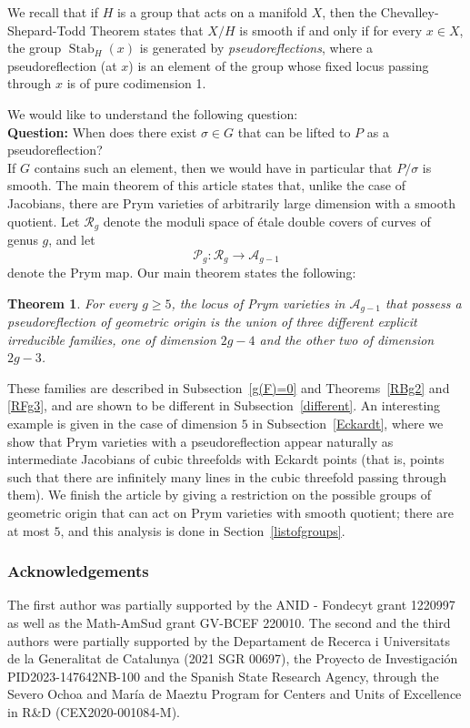 \documentclass[preprint,12pt]{amsart}
\def\cA{\ensuremath{\mathcal{A}}}
\def\cP{\ensuremath{\mathcal{P}}}
\def\cR{\ensuremath{\mathcal{R}}}
\theoremstyle{plain}
\newtheorem{theorem}{Theorem}[section]
\theoremstyle{definition}
\begin{document}
We recall that if $H$ is a group that acts on a manifold $X$, then the Chevalley-Shepard-Todd Theorem states that $X/H$ is smooth if and only if for every $x\in X$, the group $\operatorname{Stab}_H(x)$ is generated by \textit{pseudoreflections}, where a pseudoreflection (at $x$) is an element of the group whose fixed locus passing through $x$ is of pure codimension 1.

We would like to understand the following question:\\

\textbf{Question:} When does there exist $\sigma\in G$ that can be lifted to $P$ as a pseudoreflection?\\

If $G$ contains such an element, then we would have in particular that $P/\sigma$ is smooth.
The main theorem of this article states that, unlike the case of Jacobians, there are Prym varieties of arbitrarily large dimension with a smooth quotient.
Let $\cR_g$ denote the moduli space of \'etale double covers of curves of genus $g$, and let 
\[\cP_g:\cR_g\to \cA_{g-1}\]
denote the Prym map.
Our main theorem states the following:

\begin{theorem}
For every $g\ge5$, the locus of Prym varieties in $\cA_{g-1}$ that possess a pseudoreflection of geometric origin is the union of three different explicit irreducible families, one of dimension $2g-4$ and the other two of dimension $2g-3$.
\end{theorem}

These families are described in Subsection~\ref{g(F)=0} and Theorems~\ref{RBg2} and \ref{RFg3}, and are shown to be different in Subsection~\ref{different}.
An interesting example is given in the case of dimension $5$ in Subsection~\ref{Eckardt}, where we show that Prym varieties with a pseudoreflection appear naturally as intermediate Jacobians of cubic threefolds with Eckardt points (that is, points such that there are infinitely many lines in the cubic threefold passing through them).
We finish the article by giving a restriction on the possible groups of geometric origin that can act on Prym varieties with smooth quotient; there are at most $5$, and this analysis is done in Section~\ref{listofgroups}.

\subsubsection*{Acknowledgements}
The first author was partially supported by the ANID - Fondecyt grant 1220997 as well as the Math-AmSud grant GV-BCEF 220010.
The second and the third authors were partially supported by the Departament de Recerca i Universitats de la Generalitat de Catalunya (2021 SGR 00697), the Proyecto de Investigaci\'on PID2023-147642NB-100 and the Spanish State Research Agency, through the Severo Ochoa and María de Maeztu Program for Centers and Units of Excellence in R\&D (CEX2020-001084-M).
\end{document}

